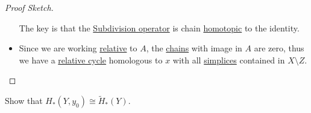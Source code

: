 \begin{proof}[Proof Sketch]
\begin{itemize}
		      The key is that the \underline{Subdivision operator} is chain \hyperref[def:homotopic]{homotopic} to the identity.
		\item Since we are working \hyperref[def:relative-homology-group]{relative} to \(A\), the \hyperref[def:relative-chain-group]{chains} with image
		      in \(A\) are zero, thus we have a \hyperref[def:relative-cycle]{relative cycle} homologous to \(x\)
		      with all \hyperref[def:standard-simplex]{simplices} contained in \(X \setminus Z\).
	\end{itemize}
\end{proof}

\begin{exercise}
	Show that \(H_\ast(Y, y_0) \cong \widetilde{H}_\ast(Y)\).
\end{exercise}

